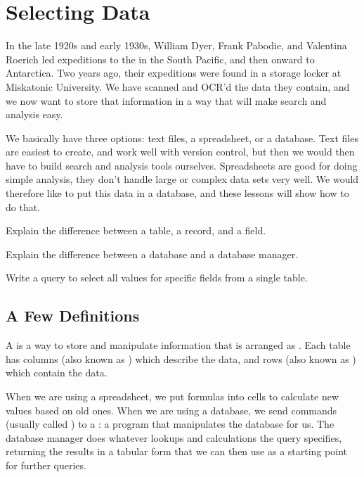 \documentclass{book}
\begin{document}
\section{Selecting Data}

In the late 1920s and early 1930s, William Dyer, Frank Pabodie, and
Valentina Roerich led expeditions to the
 in the South Pacific, and then onward to Antarctica.
Two years ago, their expeditions were found in a storage locker at
Miskatonic University. We have scanned and OCR'd the data they contain,
and we now want to store that information in a way that will make search
and analysis easy.

We basically have three options: text files, a spreadsheet, or a
database. Text files are easiest to create, and work well with version
control, but then we would then have to build search and analysis tools
ourselves. Spreadsheets are good for doing simple analysis, they don't
handle large or complex data sets very well. We would therefore like to
put this data in a database, and these lessons will show how to do that.

\begin{objectives}
\begin{swcitemize}
\item
  Explain the difference between a table, a record, and a field.
\item
  Explain the difference between a database and a database manager.
\item
  Write a query to select all values for specific fields from a single
  table.
\end{swcitemize}
\end{objectives}

\subsection{A Few Definitions}

A  is a way to
store and manipulate information that is arranged as
. Each table has columns (also known
as ) which describe the data, and
rows (also known as ) which contain
the data.

When we are using a spreadsheet, we put formulas into cells to calculate
new values based on old ones. When we are using a database, we send
commands (usually called ) to a
: a program that
manipulates the database for us. The database manager does whatever
lookups and calculations the query specifies, returning the results in a
tabular form that we can then use as a starting point for further
queries.
\end{document}
